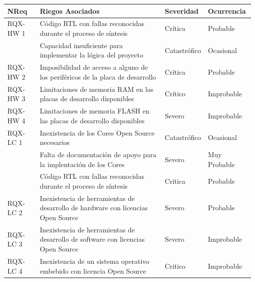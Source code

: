 		\begin{table}[!h]
		\centering
		\begin{tabular}{ p{2.5cm} p{9cm} p{2cm} p{2cm} }
		\hline 
		\rowcolor[gray]{0.8} N\textordmasculine Req & Riegos Asociados & Severidad  & Ocurrencia \\
		\hline
		RQX-HW 1& Código RTL con fallas reconocidas durante el proceso de síntesis & Crítica       & Probable \\
		\hline
				& Capacidad insuficiente para implementar la lógica del proyecto   & Catastrófico  & Ocasional\\	 
		\hline
		RQX-HW 2& Imposibilidad de acceso a alguno de los periféricos de la placa de desarrollo &  Crítica  & Probable\\
		\hline
		RQX-HW 3& Limitaciones de memoria RAM en las placas de desarrollo disponibles 	& Crítico  &  Improbable\\	 
		\hline
		RQX-HW 4& Limitaciones de memoria FLASH en las placas de desarrollo disponibles & Severo  &  Improbable\\ 
		\hline
		RQX-LC 1& Inexistencia de los Cores Open Source necesarios  	& Catastrófico  &  Ocasional\\
		\hline
				& Falta de documentación de apoyo para la implentación de los Cores  & Severo  &  Muy Probable\\ 
		\hline
		 		& Código RTL con fallas reconocidas durante el proceso de síntesis   & Critica & Probable\\ 
		\hline
		RQX-LC 2& Inexistencia de herramientas de desarrollo de hardware con licencias Open Source & Severo  &  Probable\\
		\hline
		RQX-LC 3& Inexistencia de herramientas de desarrollo de software con licencias Open Source & Severo  &  Improbable\\
		\hline
		RQX-LC 4& Inexistencia de un sistema operativo embebido con licencia Open Source  & Critico  &  Improbable\\
		

\end{tabular}
\end{table}
